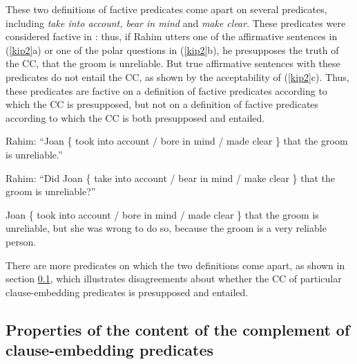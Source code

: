 \documentclass[11pt,fleqn]{article}
\newcommand{\6}{\mbox{$[\hspace*{-.6mm}[$}}
\newcommand{\9}{\mbox{$]\hspace*{-.6mm}]$}}
\begin{document}
These two definitions of factive predicates come apart on several predicates, including {\em take into account, bear in mind} and {\em make clear}. These predicates were considered factive in \citealt{kiparsky-kiparsky70}: thus, if Rahim utters one of the affirmative sentences in (\ref{kip2}a) or one of the polar questions in (\ref{kip2}b), he presupposes the truth of the CC, that the groom is unreliable. But true affirmative sentences with these predicates do not entail the CC, as shown by the acceptability of (\ref{kip2}c). Thus, these predicates are factive on a definition of factive predicates according to which the CC is presupposed, but not on a definition of factive predicates according to which the CC is both presupposed and entailed.

\begin{exe}
\ex\label{kip2}
\begin{xlist}
\ex Rahim: ``Joan  \{ took into account / bore in mind / made clear \}  that the groom is unreliable.''

\ex Rahim: ``Did Joan \{ take into account / bear in mind / make clear \} that the groom is unreliable?''

\ex Joan  \{ took into account / bore in mind / made clear \} that the groom is unreliable, but she was wrong to do so, because the groom is a very reliable person.
\end{xlist}
\end{exe}
There are more predicates on which the two definitions come apart, as shown in section \ref{s12}, which illustrates disagreements about whether the CC of particular clause-embedding predicates is presupposed and entailed.

\subsection{Properties of the content of the complement of clause-embedding predicates}\label{s12}
\end{document}
